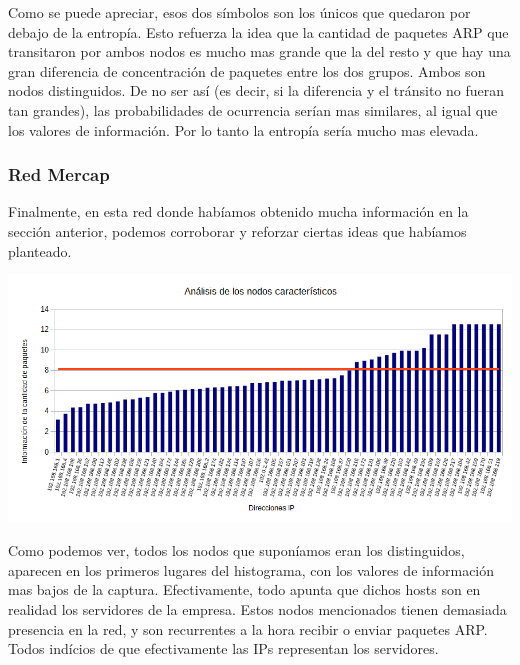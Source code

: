 Como se puede apreciar, esos dos símbolos son los únicos que quedaron por debajo de la entropía. Esto refuerza la idea que la cantidad de paquetes ARP que transitaron por ambos nodos es mucho mas grande que la del resto y que hay una gran diferencia de concentración de paquetes entre los dos grupos. Ambos son nodos distinguidos. De no ser así (es decir, si la diferencia y el tránsito no fueran tan grandes), las probabilidades de ocurrencia serían mas similares, al igual que los valores de información. Por lo tanto la entropía sería mucho mas elevada.

\subsubsection{Red Mercap}

Finalmente, en esta red donde habíamos obtenido mucha información en la sección anterior, podemos corroborar y reforzar ciertas ideas que habíamos planteado.

\centerline{\includegraphics[width=1\textwidth]{./graficos/paquetesVSIP/laburo_eze.png}}

Como podemos ver, todos los nodos que suponíamos eran los distinguidos, aparecen en los primeros lugares del histograma, con los valores de información mas bajos de la captura. Efectivamente, todo apunta que dichos hosts son en realidad los servidores de la empresa. Estos nodos mencionados tienen demasiada presencia en la red, y son recurrentes a la hora recibir o enviar paquetes ARP. Todos indícios de que efectivamente las IPs representan los servidores.